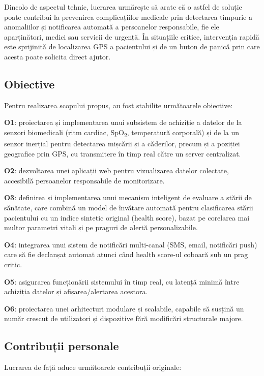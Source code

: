 \documentclass[12pt,a4paper,twoside]{article}
\newcommand{\spo}{SpO\textsubscript{2}}
\begin{document}
Dincolo de aspectul tehnic, lucrarea urmărește să arate că o astfel de soluție poate contribui la prevenirea complicațiilor medicale prin detectarea timpurie a anomaliilor și notificarea automată a persoanelor responsabile, fie ele aparținători, medici sau servicii de urgență. În situațiile critice, intervenția rapidă este sprijinită de localizarea GPS a pacientului și de un buton de panică prin care acesta poate solicita direct ajutor.

\subsection{Obiective}

Pentru realizarea scopului propus, au fost stabilite următoarele obiective:

\textbf{O1}: proiectarea și implementarea unui subsistem de achiziție a datelor de la senzori biomedicali (ritm cardiac, \spo, temperatură corporală) și de la un senzor inerțial pentru detectarea mișcării și a căderilor, precum și a poziției geografice prin GPS, cu transmitere în timp real către un server centralizat.

\textbf{O2}: dezvoltarea unei aplicații web pentru vizualizarea datelor colectate, accesibilă persoanelor responsabile de monitorizare.

\textbf{O3}: definirea și implementarea unui mecanism inteligent de evaluare a stării de sănătate, care combină un model de învățare automată pentru clasificarea stării pacientului cu un indice sintetic original (health score), bazat pe corelarea mai multor parametri vitali și pe praguri de alertă personalizabile.

\textbf{O4}: integrarea unui sistem de notificări multi-canal (SMS, email, notificări push) care să fie declanșat automat atunci când health score-ul coboară sub un prag critic.

\textbf{O5}: asigurarea funcționării sistemului în timp real, cu latență minimă între achiziția datelor și afișarea/alertarea acestora.

\textbf{O6}: proiectarea unei arhitecturi modulare și scalabile, capabile să susțină un număr crescut de utilizatori și dispozitive fără modificări structurale majore.

\subsection{Contribuții personale}

Lucrarea de față aduce următoarele contribuții originale:
\end{document}
